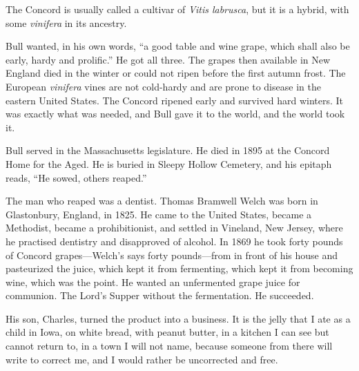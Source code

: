 The Concord is usually called a cultivar of \textit{Vitis
labrusca}, but it is a hybrid, with some \textit{vinifera} in its
ancestry.

Bull wanted, in his own words, ``a good table and wine grape, which shall
also be early, hardy and prolific.'' He got all three. The grapes then
available in New England died in the winter or could not ripen before the
first autumn frost. The European \textit{vinifera} vines are not
cold-hardy and are prone to disease in the eastern United States. The
Concord ripened early and survived hard winters. It was exactly what was
needed, and Bull gave it to the world, and the world took it.

Bull served in the Massachusetts legislature. He died in 1895 at the
Concord Home for the Aged. He is buried in Sleepy Hollow Cemetery, and his
epitaph reads, ``He sowed, others reaped.''

The man who reaped was a dentist. Thomas Bramwell Welch was born in
Glastonbury, England, in 1825. He came to the United States, became a
Methodist, became a prohibitionist, and settled in Vineland, New Jersey,
where he practised dentistry and disapproved of alcohol. In 1869 he took
forty pounds of Concord grapes---Welch's says forty pounds---from in front
of his house and pasteurized the juice, which kept it from fermenting,
which kept it from becoming wine, which was the point. He wanted an
unfermented grape juice for communion. The Lord's Supper without the
fermentation. He succeeded.

His son, Charles, turned the product into a
business. It is the jelly that I ate as a child in
Iowa, on white bread, with peanut butter, in a kitchen I can see but
cannot return to, in a town I will not name, because someone from there
will write to correct me, and I would rather be uncorrected and free.

